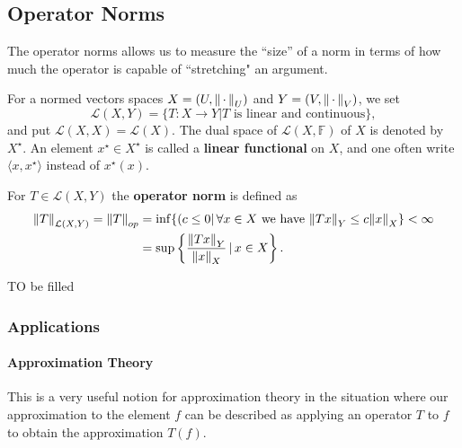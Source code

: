 \documentclass[../main.tex]{subfiles}
\begin{document}
\subsection{Operator Norms}
The operator norms allows us to measure the 
``size'' of a norm in terms of how much the operator is capable of ``stretching" an argument.
\begin{definition}
For a normed vectors spaces $X = (U,\norm{\, \cdot \,}_U)$ and $Y = (V,\norm{\, \cdot \,}_V)$, we set
\begin{equation}
    \mathcal{L}(X,Y) = \{ T: X \rightarrow Y | T  \text{ is linear and continuous} \},
\end{equation}
and put $\mathcal{L}(X,X) = \mathcal{L}(X)$. The dual space of $\mathcal{L}(X,\mathbb{F})$ of $X$ is denoted by $X^\star$. An element $x^\star \in X^\star$ is called a \textbf{linear functional} on $X$, and one often write $\langle x,x^\star \rangle$ instead of $x^\star (x)$.

For $T \in \mathcal{L}(X,Y)$ the \textbf{operator norm} is defined as 
\begin{align}
    \norm{T}_{\mathcal{L}(X,Y)} = \norm{T}_{op}
    &= \inf\{(c \leq 0 |\, \forall x \in X \text{ we have } \norm{Tx}_Y \leq c \norm{x}_X \} < \infty \\
    &= \sup\left\{ \frac{\norm{Tx}_Y}{\norm{x}_X } \, | \, x \in X \right\}.
\end{align}
\end{definition}

\begin{prop}
TO be filled
\end{prop}

\subsubsection{Applications}
\paragraph{Approximation Theory}
This is a very useful notion for approximation theory in the situation where our approximation to the element $f$ can be described as applying an operator $T$ to $f$ to obtain the approximation $T(f)$.
\end{document}
